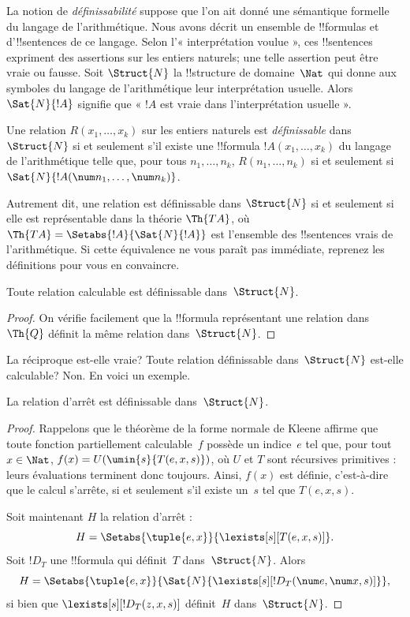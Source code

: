 \documentclass[../../../include/open-logic-section]{subfiles}
\begin{document}


La notion de \emph{définissabilité} suppose que
l'on ait donné une sémantique formelle du langage
de l'arithmétique. Nous avons décrit un ensemble de
!!{formula}s et d'!!{sentence}s de ce langage.
Selon l'« interprétation voulue », ces
!!{sentence}s expriment des assertions sur les
entiers naturels; une telle assertion peut être
vraie ou fausse. Soit $\Struct{N}$ la
!!{structure} de domaine~$\Nat$ qui donne aux
symboles du langage de l'arithmétique leur
interprétation usuelle. Alors $\Sat{N}{!A}$
signifie que « $!A$ est vraie dans l'interprétation
usuelle ».

\begin{defn}
Une relation $R(x_1,\dots,x_k)$ sur les entiers
naturels est \emph{définissable} dans~$\Struct{N}$
si et seulement s'il existe une !!{formula}
$!A(x_1,\dots,x_k)$ du langage de l'arithmétique
telle que, pour tous $n_1,\dots,n_k$,
$R(n_1,\dots,n_k)$ si et seulement si
$\Sat{N}{!A(\num n_1,\dots,\num n_k)}$.
\end{defn}

Autrement dit, une relation est définissable dans
$\Struct{N}$ si et seulement si elle est
représentable dans la théorie $\Th{TA}$, où
$\Th{TA}=\Setabs{!A}{\Sat{N}{!A}}$ est l'ensemble
des !!{sentence}s vrais de l'arithmétique.
Si cette équivalence ne vous paraît pas immédiate,
reprenez les définitions pour vous en convaincre.

\begin{lem}
Toute relation calculable est définissable
dans~$\Struct{N}$.
\end{lem}

\begin{proof}
On vérifie facilement que la !!{formula}
représentant une relation dans~$\Th{Q}$ définit
la même relation dans~$\Struct{N}$.
\end{proof}

La réciproque est-elle vraie? Toute relation
définissable dans~$\Struct{N}$ est-elle calculable?
Non. En voici un exemple.

\begin{lem}
La relation d'arrêt est définissable
dans~$\Struct{N}$.
\end{lem}

\begin{proof}
Rappelons que le théorème de la forme normale de
Kleene affirme que toute fonction partiellement
calculable~$f$ possède un indice~$e$ tel que,
pour tout $x\in\Nat$,
$f(x)=U(\umin{s}{T(e,x,s)})$, où $U$ et $T$
sont récursives primitives : leurs évaluations
terminent donc toujours.
Ainsi, $f(x)$ est définie, c'est-à-dire que le
calcul s'arrête, si et seulement s'il existe
un~$s$ tel que $T(e,x,s)$.

Soit maintenant $H$ la relation d'arrêt :
\[
H=\Setabs{\tuple{e,x}}{\lexists[s][T(e,x,s)]}.
\]
Soit $!D_T$ une !!{formula} qui définit~$T$
dans~$\Struct{N}$. Alors
\[
H=\Setabs{\tuple{e,x}}{
\Sat{N}{\lexists[s][!D_T(\num e,\num x,s)]}},
\]
si bien que
$\lexists[s][!D_T(z,x,s)]$ définit~$H$
dans~$\Struct{N}$.
\end{proof}
\end{document}
